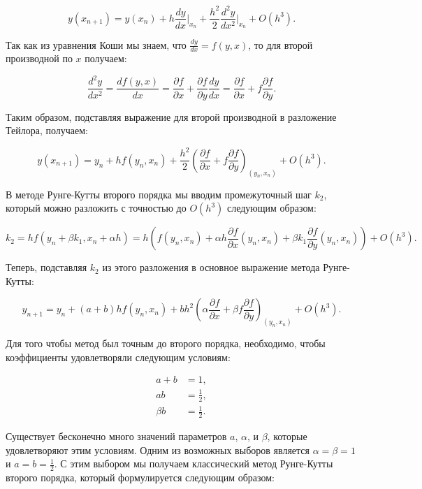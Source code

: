 \documentclass{article}
\begin{document}
\begin{equation}
y(x_{n+1}) = y(x_n) + h \frac{dy}{dx} \Big|_{x_n} + \frac{h^2}{2} \frac{d^2y}{dx^2} \Big|_{x_n} + O(h^3).
\end{equation}

Так как из уравнения Коши мы знаем, что $\frac{dy}{dx} = f(y, x)$, то для второй производной по $x$ получаем:

\begin{equation}
\frac{d^2y}{dx^2} = \frac{df(y, x)}{dx} = \frac{\partial f}{\partial x} + \frac{\partial f}{\partial y} \frac{dy}{dx} = \frac{\partial f}{\partial x} + f \frac{\partial f}{\partial y}.
\end{equation}

Таким образом, подставляя выражение для второй производной в разложение Тейлора, получаем:

\begin{equation}
y(x_{n+1}) = y_n + h f(y_n, x_n) + \frac{h^2}{2} \left( \frac{\partial f}{\partial x} + f \frac{\partial f}{\partial y} \right)_{(y_n, x_n)} + O(h^3).
\end{equation}

В методе Рунге-Кутты второго порядка мы вводим промежуточный шаг $k_2$, который можно разложить с точностью до $O(h^3)$ следующим образом:

\begin{equation}
k_2 = h f(y_n + \beta k_1, x_n + \alpha h) = h \left( f(y_n, x_n) + \alpha h \frac{\partial f}{\partial x} (y_n, x_n) + \beta k_1 \frac{\partial f}{\partial y} (y_n, x_n) \right) + O(h^3).
\end{equation}

Теперь, подставляя $k_2$ из этого разложения в основное выражение метода Рунге-Кутты:

\begin{equation}
y_{n+1} = y_n + (a + b) h f(y_n, x_n) + b h^2 \left( \alpha \frac{\partial f}{\partial x} + \beta f \frac{\partial f}{\partial y} \right)_{(y_n, x_n)} + O(h^3).
\end{equation}

Для того чтобы метод был точным до второго порядка, необходимо, чтобы коэффициенты удовлетворяли следующим условиям:

\begin{align}
a + b &= 1, \\
a b &= \frac{1}{2}, \\
\beta b &= \frac{1}{2}.
\end{align}

Существует бесконечно много значений параметров $a$, $\alpha$, и $\beta$, которые удовлетворяют этим условиям. Одним из возможных выборов является $\alpha = \beta = 1$ и $a = b = \frac{1}{2}$. С этим выбором мы получаем классический метод Рунге-Кутты второго порядка, который формулируется следующим образом:
\end{document}
